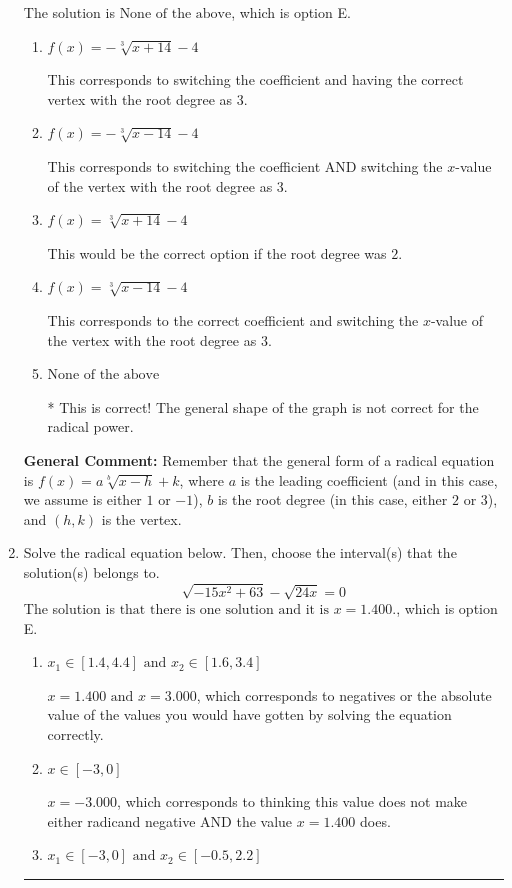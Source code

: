 \documentclass{extbook}[14pt]
\newcommand{\litem}[1]{\item #1

\rule{\textwidth}{0.4pt}}
\begin{document}
\begin{enumerate}
{The solution is \( \text{None of the above} \), which is option E.\begin{enumerate}[label=\Alph*.]
\item \( f(x) = - \sqrt[3]{x + 14} - 4 \)

This corresponds to switching the coefficient and having the correct vertex with the root degree as $3$.
\item \( f(x) = - \sqrt[3]{x - 14} - 4 \)

This corresponds to switching the coefficient AND switching the $x$-value of the vertex with the root degree as $3$.
\item \( f(x) = \sqrt[3]{x + 14} - 4 \)

This would be the correct option if the root degree was $2$.
\item \( f(x) = \sqrt[3]{x - 14} - 4 \)

This corresponds to the correct coefficient and switching the $x$-value of the vertex with the root degree as $3$.
\item \( \text{None of the above} \)

* This is correct! The general shape of the graph is not correct for the radical power.
\end{enumerate}

\textbf{General Comment:} Remember that the general form of a radical equation is $ f(x) = a \sqrt[b]{x - h} + k$, where $a$ is the leading coefficient (and in this case, we assume is either $1$ or $-1$), $b$ is the root degree (in this case, either $2$ or $3$), and $(h, k)$ is the vertex.
}
\litem{
Solve the radical equation below. Then, choose the interval(s) that the solution(s) belongs to.
\[ \sqrt{-15 x^2 + 63} - \sqrt{24 x} = 0 \]The solution is \( \text{that there is one solution and it is } x = 1.400. \), which is option E.\begin{enumerate}[label=\Alph*.]
\item \( x_1 \in [1.4, 4.4] \text{ and } x_2 \in [1.6,3.4] \)

$x = 1.400 \text{ and } x = 3.000$, which corresponds to negatives or the absolute value of the values you would have gotten by solving the equation correctly.
\item \( x \in [-3,0] \)

$x = -3.000$, which corresponds to thinking this value does not make either radicand negative AND the value $x = 1.400$ does.
\item \( x_1 \in [-3, 0] \text{ and } x_2 \in [-0.5,2.2] \)


\end{enumerate}}
\end{enumerate}
\end{document}
